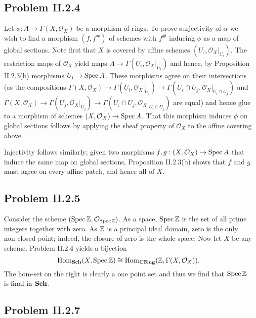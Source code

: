 \documentclass{mathnotes}
\begin{document}
\subsection*{Problem II.2.4}
Let $\phi:A\to\Gamma(X,\mathcal{O}_X)$ be a morphism of rings. To prove surjectivity of $\alpha$ we wish to find a morphism $(f,f^\#)$ of schemes
with $f^\#$ inducing $\phi$ as a map of global sections. Note first that $X$ is covered by affine schemes $(U_i,\mathcal{O}_X|_{U_i})$.
The restriction maps of $\mathcal{O}_X$ yield maps $A\to\Gamma(U_i,\mathcal{O}_X|_{U_i})$ and hence,
by Proposition II.2.3(b) morphisms $U_i\to\operatorname{Spec} A$. These morphisms agree on their intersections (as
the compositions $\Gamma(X,\mathcal{O}_X)\to \Gamma(U_i,\mathcal{O}_X|_{U_i})\to\Gamma(U_i\cap U_j,\mathcal{O}_X|_{U_i\cap U_j})$
and $\Gamma(X,\mathcal{O}_X)\to \Gamma(U_j,\mathcal{O}_X|_{U_j})\to\Gamma(U_i\cap U_j,\mathcal{O}_X|_{U_i\cap U_j})$
are equal) and hence glue to a morphism of schemes $(X,\mathcal{O}_X)\to\operatorname{Spec} A$. That this morphism induces
$\phi$ on global sections follows by applying the sheaf property of $\mathcal{O}_X$ to the affine covering above.

Injectivity follows similarly; given two morphisms $f,g:(X,\mathcal{O}_X)\to\operatorname{Spec} A$ that induce the same
map on global sections, Proposition II.2.3(b) shows that $f$ and $g$ must agree on every affine patch, and
hence all of $X$.

\subsection*{Problem II.2.5}
Consider the scheme $(\operatorname{Spec}\mathbb{Z},\mathcal{O}_{\operatorname{Spec}\mathbb{Z}})$. As a space, $\operatorname{Spec}\mathbb{Z}$ is the set of all prime
integers together with zero. As $\mathbb{Z}$ is a principal ideal domain, zero is the only non-closed point; indeed, the
closure of zero is the whole space. Now let $X$ be any scheme.
Problem II.2.4 yields a bijection
\[\operatorname{Hom}_{ \normalfont\textbf{Sch}}(X,\operatorname{Spec}\mathbb{Z})\cong\operatorname{Hom}_{ \normalfont\textbf{CRng}}(\mathbb{Z},\Gamma(X,\mathcal{O}_X)).\]
The hom-set on the right is clearly a one point set and thus we find that $\operatorname{Spec}\mathbb{Z}$ is final in ${ \normalfont\textbf{Sch}}$.

\subsection*{Problem II.2.7}
\end{document}
